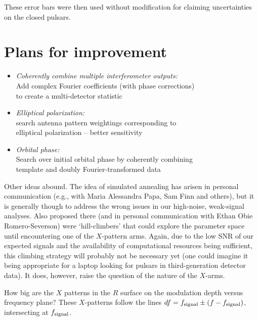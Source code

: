 These error bars were then used without modification for claiming uncertainties on the closed pulsars.



\section{Plans for improvement}

\begin{itemize}
\item \emph{Coherently combine multiple interferometer outputs: }\\
Add complex Fourier coefficients (with phase corrections)\\
to create a multi-detector statistic
\item \emph{Elliptical polarization:}\\
search antenna pattern weightings corresponding to\\
elliptical polarization -- better sensitivity
\item \emph{Orbital phase:}\\
Search over initial orbital phase by coherently combining\\
template and doubly Fourier-transformed data
\end{itemize}


Other ideas abound. The idea of simulated annealing has arisen in personal communication (e.g., with Maria Alessandra Papa, Sam Finn and others), but it is generally though to address the wrong issues in our high-noise, weak-signal analyses. Also proposed there (and in personal communication with Ethan Obie Romero-Severson) were `hill-climbers' that could explore the parameter space until encountering one of the $X$-pattern arms. Again, due to the low SNR of our expected signals and the availability of computational resources being sufficient, this climbing strategy will probably not be necessary yet (one could imagine it being appropriate for a laptop looking for pulsars in third-generation detector data). It does, however, raise the question of the nature of the $X$-arms.

            How big are the $X$ patterns in the $R$ surface on the modulation depth versus frequency plane?
These $X$-patterns follow the lines $df = f_{\textup{signal}} \pm (f - f_\textup{signal})$, intersecting at $f_\textup{signal}$.

